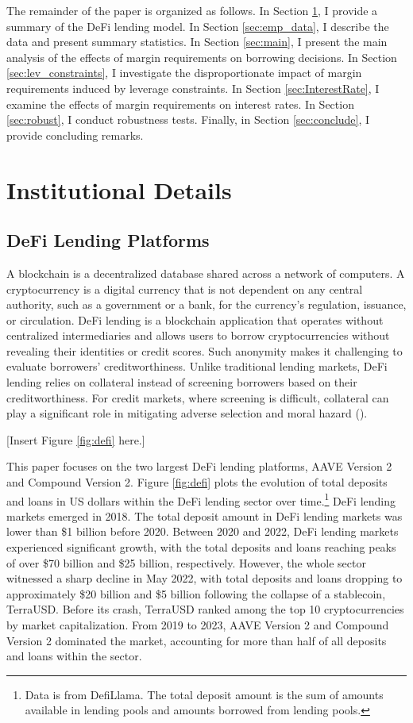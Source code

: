 \documentclass[12pt]{article}
\begin{document}
The remainder of the paper is organized as follows. In Section \ref{sec:institutional}, I provide a summary of the DeFi lending model. In Section \ref{sec:emp_data}, I describe the data and
present summary statistics. In Section \ref{sec:main}, I present the main analysis of the effects of margin requirements on borrowing decisions. In Section \ref{sec:lev_constraints}, I investigate the disproportionate impact of margin requirements induced by leverage constraints. In Section \ref{sec:InterestRate}, I examine the effects of margin requirements on interest rates. In Section \ref{sec:robust}, I conduct robustness tests. Finally, in Section \ref{sec:conclude}, I provide concluding remarks.

\section{Institutional Details}\label{sec:institutional}
\subsection{DeFi Lending Platforms}\label{institutional_example}
A blockchain is a decentralized database shared across a network of computers. A cryptocurrency is a digital currency that is not dependent on any central authority, such as a government or a bank, for the currency's regulation, issuance, or circulation. DeFi lending is a blockchain application that operates without centralized intermediaries and allows users to borrow cryptocurrencies without revealing their identities or credit scores. Such anonymity makes it challenging to evaluate borrowers' creditworthiness. Unlike traditional lending markets, DeFi lending relies on collateral instead of screening borrowers based on their creditworthiness. For credit markets, where screening is difficult, collateral can play a significant role in mitigating adverse selection and moral hazard (\citealp{ioannidou2022collateral}).

      \centerline{[Insert Figure \ref{fig:defi} here.]}

   This paper focuses on the two largest DeFi lending platforms, AAVE Version 2 and Compound Version 2. Figure \ref{fig:defi} plots the evolution of total deposits and loans in US dollars within the DeFi lending sector over time.\footnote{Data is from DefiLlama. The total deposit amount is the sum of amounts available in lending pools and amounts borrowed from lending pools.} DeFi lending markets emerged in 2018. The total deposit amount in DeFi lending markets was lower than \$1 billion before 2020. Between 2020 and 2022, DeFi lending markets experienced significant growth, with the total deposits and loans reaching peaks of over \$70 billion and \$25 billion, respectively. However, the whole sector witnessed a sharp decline in May 2022, with total deposits and loans dropping to approximately \$20 billion and \$5 billion following the collapse of a stablecoin, TerraUSD. Before its crash, TerraUSD ranked among the top 10 cryptocurrencies by market capitalization. From 2019 to 2023, AAVE Version 2 and Compound Version 2 dominated the market, accounting for more than half of all deposits and loans within the sector. 
\end{document}
